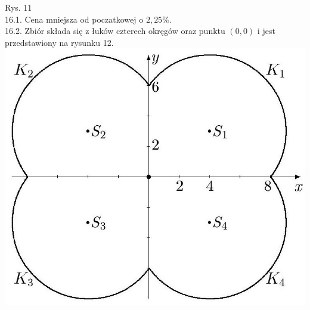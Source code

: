 \documentclass[10pt]{article}
\begin{document}
Rys. 11\\
16.1. Cena mniejsza od poczatkowej o $2,25 \%$.\\
16.2. Zbiór składa się z łuków czterech okręgów oraz punktu $(0,0)$ i jest przedstawiony na rysunku 12.\\
\includegraphics[max width=\textwidth, center]{2024_11_16_fe5b564401bf7db98894g-065}
\end{document}
